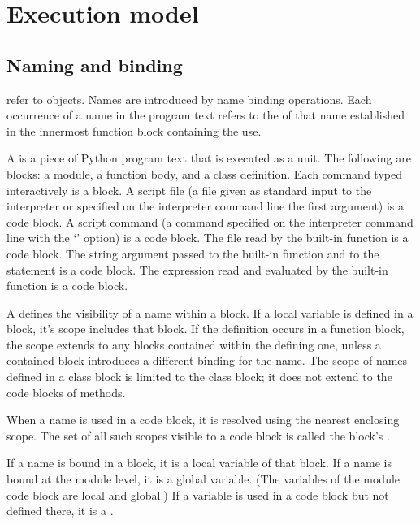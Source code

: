 \chapter{Execution model \label{execmodel}}


\section{Naming and binding \label{naming}}

 refer to objects.  Names are introduced by
name binding operations.  Each occurrence of a name in the program
text refers to the  of that name
established in the innermost function block containing the use.

A  is a piece of Python program text that is
executed as a unit.  The following are blocks: a module, a function
body, and a class definition.  Each command typed interactively is a
block.  A script file (a file given as standard input to the
interpreter or specified on the interpreter command line the first
argument) is a code block.  A script command (a command specified on
the interpreter command line with the `' option) is a code
block.  The file read by the built-in function 
is a code block.  The string argument passed to the built-in function
 and to the  statement is a code block.
The expression read and evaluated by the built-in function
 is a code block.

A  defines the visibility of a name within a
block.  If a local variable is defined in a block, it's scope includes
that block.  If the definition occurs in a function block, the scope
extends to any blocks contained within the defining one, unless a
contained block introduces a different binding for the name.  The
scope of names defined in a class block is limited to the class block;
it does not extend to the code blocks of methods.

When a name is used in a code block, it is resolved using the nearest
enclosing scope.  The set of all such scopes visible to a code block
is called the block's .  

If a name is bound in a block, it is a local variable of that block.
If a name is bound at the module level, it is a global variable.  (The
variables of the module code block are local and global.)  If a
variable is used in a code block but not defined there, it is a
.

